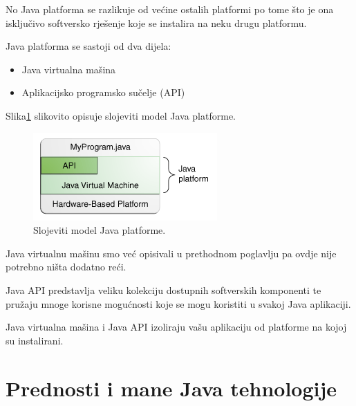 No Java platforma se razlikuje od većine ostalih platformi po tome što je ona isključivo softversko rješenje koje se instalira na neku drugu platformu.

Java platforma se sastoji od dva dijela:

\begin{itemize}
    \item Java virtualna mašina
    \item Aplikacijsko programsko sučelje (API)
\end{itemize}

Slika\ref{fig:java-platform-layer-model} slikovito opisuje slojeviti model Java platforme.~\cite{javatutorials}

\begin{figure}[h!]
    \label{fig:java-platform-layer-model}
    \caption{Slojeviti model Java platforme.}
    \centering
    \includegraphics[scale=0.6]{images/java-platform-layer-model.png}
\end{figure}

Java virtualnu mašinu smo već opisivali u prethodnom poglavlju pa ovdje nije potrebno ništa dodatno reći.

Java API predstavlja veliku kolekciju dostupnih softverskih komponenti te pružaju mnoge korisne mogućnosti koje se mogu koristiti u svakoj Java aplikaciji.

\begin{infobox}
    Java virtualna mašina i Java API izoliraju vašu aplikaciju od platforme na kojoj su instalirani.
\end{infobox}

\section{Prednosti i mane Java tehnologije}